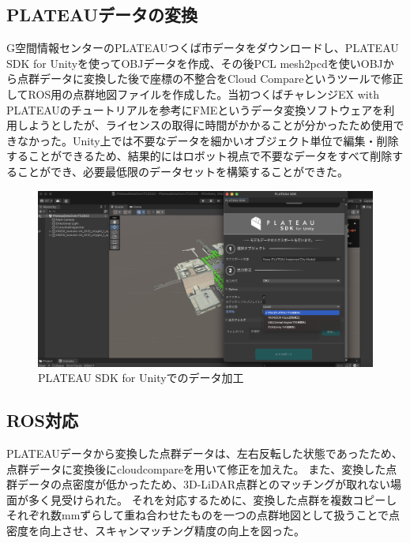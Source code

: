 \documentclass[platex,dvipdfmx]{rbproceedings}
\begin{document}
\subsection{PLATEAUデータの変換}
G空間情報センターのPLATEAUつくば市データ\cite{pltsukuba}をダウンロードし、PLATEAU SDK for Unity\cite{plateau_unity}を使ってOBJデータを作成、その後PCL mesh2pcd\cite{pcl_mesh2pcd}を使いOBJから点群データに変換した後で座標の不整合をCloud Compareというツールで修正してROS用の点群地図ファイルを作成した。当初つくばチャレンジEX with PLATEAUのチュートリアル\cite{tcexpl}を参考にFMEというデータ変換ソフトウェアを利用しようとしたが、ライセンスの取得に時間がかかることが分かったため使用できなかった。Unity上では不要なデータを細かいオブジェクト単位で編集・削除することができるため、結果的にはロボット視点で不要なデータをすべて削除することができ、必要最低限のデータセットを構築することができた。
\begin{figure}
    \centering
    \includegraphics[width=0.8\linewidth]{picture/plateau_unity.png}
    \caption{PLATEAU SDK for Unityでのデータ加工}
    \label{fig:plateau_unity}
\end{figure}

\subsection{ROS対応}
PLATEAUデータから変換した点群データは、左右反転した状態であったため、点群データに変換後にcloudcompareを用いて修正を加えた。
また、変換した点群データの点密度が低かったため、3D-LiDAR点群とのマッチングが取れない場面が多く見受けられた。
それを対応するために、変換した点群を複数コピーしそれぞれ数mmずらして重ね合わせたものを一つの点群地図として扱うことで点密度を向上させ、スキャンマッチング精度の向上を図った。
\end{document}
